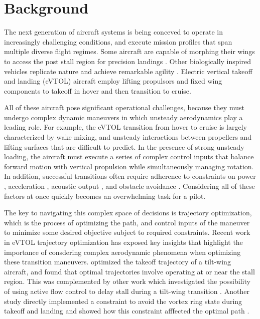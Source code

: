 \documentclass[12pt, letterpaper]{article}
\begin{document}
\section{Background}


The next generation of aircraft systems is being conceved to operate in increasingly challenging conditions, and execute mission profiles that span multiple diverse flight regimes.  Some aircraft are capable of morphing their wings to access the post stall region for precision landings \cite{}.  Other biologically inspired vehicles replicate nature and achieve remarkable agility \cite{}.  Electric vertical takeoff and landing (eVTOL) aircraft employ lifting propulsors and fixed wing components to takeoff in hover and then transition to cruise.  

All of these aircraft pose significant operational challenges, because they must undergo complex dynamic maneuvers in which unsteady aerodynamics play a leading role.  For example, the eVTOL transition from hover to cruise is largely characterized by wake mixing, and unsteady interactions between propellers and lifting surfaces that are difficult to predict.  In the presence of strong unsteady loading, the aircraft must execute a series of complex control inputs that balance forward motion with vertical propulsion while simultaneously managing rotation. In addition, successful transitions often require adherence to constraints on power \cite{moradi2024urban}, acceleration \cite{xiang2024autonomous}, acoustic output \cite{raza2025noise}, and obstacle avoidance \cite{shukla2025trajectory}. Considering all of these factors at once quickly becomes an overwhelming task for a pilot.

The key to navigating this complex space of decisions is trajectory optimization, which is the process of optimizing the path, and control inputs of the maneuver to minimize some desired objective subject to required constraints.  Recent work in eVTOL trajectory optimization has exposed key insights that highlight the importance of consdering complex aerodynamic phenomena when optimizing these transition maneuvers.  \cite{} optimized the takeoff trajectory of a tilt-wing aircraft, and found that optimal trajectories involve operating at or near the stall region.  This was complemented by other work which investigated the possibility of using active flow control to delay stall during a tilt-wing transition \cite{}. Another study directly implemented a constraint to avoid the vortex ring state during takeoff and landing and showed how this constraint afffected the optimal path \cite{}.
\end{document}
